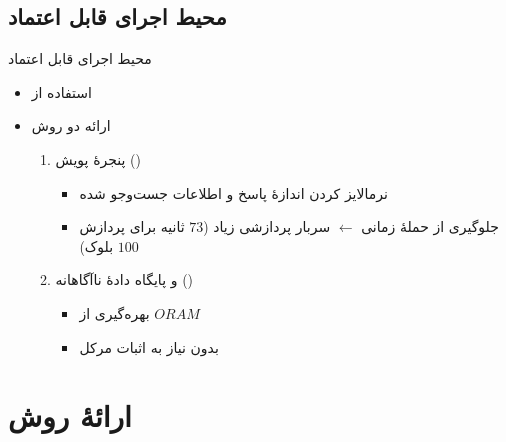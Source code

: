 \documentclass{beamer}
\begin{document}
\subsection{محیط اجرای قابل اعتماد}
\begin{frame}{محیط اجرای قابل اعتماد}
	\begin{itemize}
		\item {%
		استفاده از }
		\item{%
			ارائه دو روش
			\begin{enumerate}
				\item {%
				 پنجرهٔ پویش ()
			\begin{itemize}
				\item نرمالایز کردن اندازهٔ پاسخ و اطلاعات جست‌وجو شده
				\item {%
				جلوگیری از حملهٔ زمانی $\leftarrow$ سربار پردازشی زیاد ($73$ ثانیه برای پردازش $100$ بلوک)}
			\end{itemize}	 
		 }
			 	\item {%
			 	 و پایگاه دادهٔ ناآگاهانه ()
		 	 \begin{itemize}
		 	 	\item {%
		 	 	بهره‌گیری از $ORAM$}
	 	 		\item{%
	 	 		بدون نیاز به اثبات مرکل}
	 	 \end{itemize}}
			\end{enumerate}
		}
	\end{itemize}

\begin{center}
	{\small {}}
\end{center}
\end{frame}


\section{ارائهٔ روش\hfill}
\end{document}
